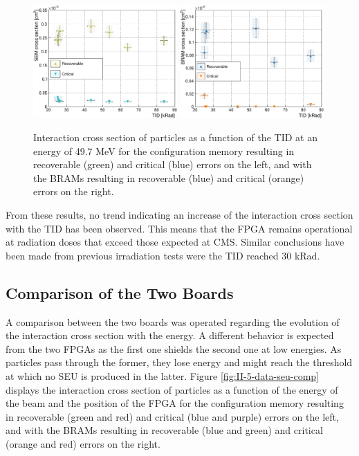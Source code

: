       \begin{figure}[h!]
        \centering
        \includegraphics[width=0.49\textwidth]{img/plots/cDose_SEM-crop}
        \includegraphics[width=0.49\textwidth]{img/plots/cDose_BRAM-crop}
        \caption{Interaction cross section of particles as a function of the TID at an energy of 49.7 MeV for the configuration memory resulting in recoverable (green) and critical (blue) errors on the left, and with the BRAMs resulting in recoverable (blue) and critical (orange) errors on the right.}
        \label{fig:II-5-data-seu-tid}
      \end{figure}

      From these results, no trend indicating an increase of the interaction cross section with the TID has been observed. This means that the FPGA remains operational at radiation doses that exceed those expected at CMS. Similar conclusions have been made from previous irradiation tests \cite{Bylsma2013242} were the TID reached 30 kRad.

    \subsection{Comparison of the Two Boards}

      A comparison between the two boards was operated regarding the evolution of the interaction cross section with the energy. A different behavior is expected from the two FPGAs as the first one shields the second one at low energies. As particles pass through the former, they lose energy and might reach the threshold at which no SEU is produced in the latter. Figure \ref{fig:II-5-data-seu-comp} displays the interaction cross section of particles as a function of the energy of the beam and the position of the FPGA for the configuration memory resulting in recoverable (green and red) and critical (blue and purple) errors on the left, and with the BRAMs resulting in recoverable (blue and green) and critical (orange and red) errors on the right. \\

